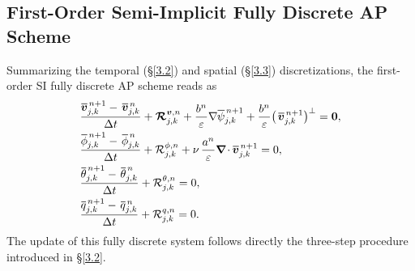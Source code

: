\documentclass[a4paper,11pt,twoside]{article}
\numberwithin{equation}{section}
\numberwithin{figure}{section}
\numberwithin{table}{section}
\newcommand{\bnabla}{\bm{\nabla}}
\newcommand{\eps}{\varepsilon}
\newcommand{\dt}{\Delta t}
\newcommand{\bv}{\bm{v}}
\newcommand*\xbar[1]{%
	\hbox{%
		\vbox{%
			\hrule height 0.5pt %
			\kern0.3ex%
			\hbox{%
				\kern-0.05em%
				\ensuremath{#1}%
				\kern-0.02em%
			}%
		}%
	}%
}
\begin{document}
\subsection{First-Order Semi-Implicit Fully Discrete AP Scheme}\label{sec34}
Summarizing the temporal (\S\ref{3.2}) and spatial (\S\ref{3.3}) discretizations, the first-order SI fully discrete AP scheme reads as
\begin{equation}
\begin{aligned}
&\frac{\xbar{\bv}^{\,n+1}_{j,k}-\,\xbar{\bv}^{\,n}_{j,k}}{\dt}+\bm{{\cal R}}^{\bv,n}_{j,k}+\frac{b^n}{\eps}\nabla\xbar{\psi}^{\,n+1}_{j,k} 
+\frac{b^n}{\eps}\big(\,\xbar{\bv}^{\,n+1}_{j,k}\big)^\perp=\bm0,\\
&\frac{\xbar{\phi}^{\,n+1}_{j,k}-\,\xbar{\phi}^{\,n}_{j,k}}{\dt}+{\cal R}^{\phi,n}_{j,k}+
\nu\,\frac{a^n}{\eps}\bnabla\!\cdot\xbar{\bv}^{\,n+1}_{j,k}=0,\\
&\frac{\xbar{\theta}^{\,n+1}_{j,k}-\,\xbar{\theta}^{\,n}_{j,k}}{\dt}+{\cal R}^{\theta,n}_{j,k}=0,\\
&\frac{\xbar q^{\,n+1}_{j,k}-\,\xbar q^{\,n}_{j,k}}{\dt}+{\cal R}^{q,n}_{j,k}=0.
\end{aligned}
\label{3.44}
\end{equation}
The update of this fully discrete system follows directly the three-step procedure introduced in \S\ref{3.2}. 

\end{document}
